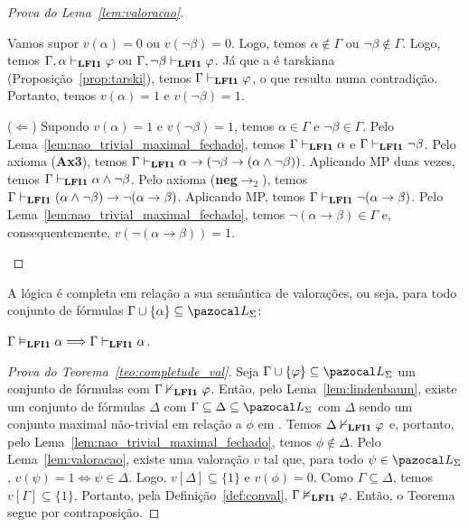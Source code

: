 \begin{proof}[Prova do Lema~\ref{lem:valoracao}]
\begin{provaporcasos}
\begin{adjustwidth}{1cm}{}
                            \noindent Vamos supor $v(\alpha) = 0$ ou $v(\neg \beta) = 0$. Logo, temos $\alpha \not \in \Gamma$ ou $\neg \beta \not \in \Gamma$. Logo, temos $\Gamma, \alpha \vdash_{{\normalfont\textbf{LFI1}}{}} \varphi$ ou $\Gamma, \neg \beta \vdash_{{\normalfont\textbf{LFI1}}{}} \varphi$. Já que a \lfium{} é tarskiana (Proposição~\ref{prop:tarski}), temos $\Gamma \vdash_{{\normalfont\textbf{LFI1}}{}} \varphi$, o que resulta numa contradição. Portanto, temos $v(\alpha) = 1$ e $v(\neg \beta) = 1$.

                            \noindent ($\Longleftarrow$) Supondo $v(\alpha) = 1$ e $v(\neg \beta) = 1$, temos $\alpha \in \Gamma$ e $\neg \beta \in \Gamma$. Pelo Lema~\ref{lem:nao_trivial_maximal_fechado}, temos $\Gamma \vdash_{{\normalfont\textbf{LFI1}}{}} \alpha$ e $\Gamma \vdash_{{\normalfont\textbf{LFI1}}{}} \neg \beta$. Pelo axioma (\textbf{Ax3}), temos $\Gamma \vdash_{{\normalfont\textbf{LFI1}}{}} \alpha \to (\neg \beta \to (\alpha \land \neg \beta))$. Aplicando MP duas vezes, temos $\Gamma \vdash_{{\normalfont\textbf{LFI1}}{}} \alpha \land \neg \beta$. Pelo axioma (\textbf{neg}$\to_2$), temos $\Gamma \vdash_{{\normalfont\textbf{LFI1}}{}} (\alpha \land \neg \beta) \to \neg (\alpha \to \beta)$. Aplicando MP, temos $\Gamma \vdash_{{\normalfont\textbf{LFI1}}{}} \neg (\alpha \to \beta)$. Pelo Lema~\ref{lem:nao_trivial_maximal_fechado}, temos $\neg (\alpha \to \beta) \in \Gamma$ e, consequentemente, $v(\neg (\alpha \to \beta)) = 1$.


                        \end{adjustwidth}

            \end{provaporcasos}


        \end{proof}
        

        \begin{teorema}\label{teo:completude_val}
            A lógica {\normalfont\lfium{}} é completa em relação a sua semântica de valorações, ou seja, para todo conjunto de fórmulas $\Gamma \cup \{\alpha\} \subseteq \ling{}$:

            \centering
            {\normalfont{} $\Gamma \vDash_{{\normalfont\textbf{LFI1}}{}} \alpha \Longrightarrow \Gamma \vdash_{{\normalfont\textbf{LFI1}}{}} \alpha$.}
        \end{teorema}

        \begin{proof}[Prova do Teorema~\ref{teo:completude_val}]
            Seja $\Gamma \cup \{\phi\} \subseteq \ling{}$ um conjunto de fórmulas com $\Gamma \nvdash_{{\normalfont\textbf{LFI1}}{}} \varphi$. Então, pelo Lema~\ref{lem:lindenbaum}, existe um conjunto de fórmulas $\Delta$ com $\Gamma \subseteq \Delta \subseteq \ling{}$ com $\Delta$ sendo um conjunto maximal não-trivial em relação a $\phi$ em \lfium{}. Temos $\Delta \nvdash_{{\normalfont\textbf{LFI1}}{}} \varphi$ e, portanto, pelo Lema~\ref{lem:nao_trivial_maximal_fechado}, temos $\phi \not \in \Delta$. Pelo Lema~\ref{lem:valoracao}, existe uma valoração $v$ tal que, para todo $\psi \in \ling{}$, $v(\psi) = 1 \Longleftrightarrow \psi \in \Delta$. Logo, $v[\Delta] \subseteq \{1\}$ e $v(\phi) = 0$. Como $\Gamma \subseteq \Delta$, temos $v[\Gamma] \subseteq \{1\}$. Portanto, pela Definição~\ref{def:conval}, $\Gamma \nvDash_{{\normalfont\textbf{LFI1}}{}} \varphi$. Então, o Teorema segue por contraposição.

        \end{proof}

